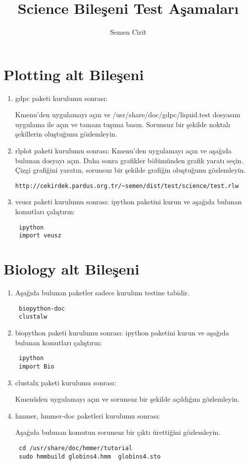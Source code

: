 \documentclass[a4paper,10pt]{article}
\title{Science Bileşeni Test Aşamaları}
\author{Semen Cirit}
\begin{document}
\maketitle


\section{Plotting alt Bileşeni}
\begin{enumerate}
 \item gdpc paketi kurulumu sonrası:

Kmenu'den uygulamayı açın ve /usr/share/doc/gdpc/liquid.test dosyasını uygulama ile açın ve tamam tuşuna basın. Sorunsuz bir şekilde noktalı şekillerin oluştuğunu gözlemleyin.

\item rlplot paketi kurulumu sonrası:
Kmenu'den uygulamayı açın ve aşağıda bulunan dosyayı açın. Daha sonra grafikler bölümünden grafik yaratı seçin. Çizgi grafiğini yaratın, sorunsuz bir şekilde grafiğin oluştuğunu gözlemleyin.

\begin{verbatim}
http://cekirdek.pardus.org.tr/~semen/dist/test/science/test.rlw 
\end{verbatim}
\item veusz paketi kurulumu sonrası:
ipython paketini kurun ve aşağıda bulunan komutları çalıştırın:
\begin{verbatim}
 ipython
 import veusz
\end{verbatim}
\end{enumerate}



\section{Biology alt Bileşeni}
\begin{enumerate}

\item Aşağıda bulunan paketler sadece kurulum testine tabidir.
\begin{verbatim}
 biopython-doc
 clustalw
\end{verbatim}

\item biopython paketi kurulumu sonrası:
ipython paketini kurun ve aşağıda bulunan komutları çalıştırın:
\begin{verbatim}
 ipython
 import Bio
\end{verbatim}

\item clustalx paketi kurulumu sonrası:

Kmenüden uygulamayı açın ve sorunsuz bir şekilde açıldığını gözlemleyin.

\item hmmer, hmmer-doc paketleri kurulumu sonrası:

Aşağıda bulunan komutun sorunsuz bir çıktı ürettiğini gözlemleyin.
\begin{verbatim}
 cd /usr/share/doc/hmmer/tutorial
 sudo hmmbuild globins4.hmm  globins4.sto
\end{verbatim}

\end{enumerate}
\end{document}
